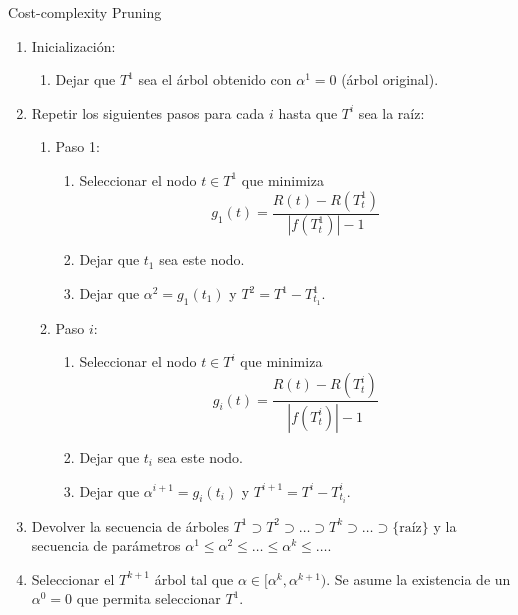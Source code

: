 \begin{algorithm}[h]
\label{ccp}
\SetAlgoLined
\caption{Cost-complexity Pruning}
\medskip
\begin{enumerate}
    \item Inicialización:
    \begin{enumerate}
        \item Dejar que $T^1$ sea el árbol obtenido con $\alpha^1 = 0$ (árbol original).
    \end{enumerate}
    \item Repetir los siguientes pasos para cada $i$ hasta que $T^i$ sea la raíz:
    \begin{enumerate}
        \item Paso 1:
        \begin{enumerate}
            \item Seleccionar el nodo $t \in T^1$ que minimiza 
            \[
            g_1(t) = \frac{R(t) - R(T_t^1)}{|f(T_t^1)| - 1}
            \]
            \item Dejar que $t_1$ sea este nodo.
            \item Dejar que $\alpha^2 = g_1(t_1)$ y $T^2 = T^1 - T_{t_1}^1$.
        \end{enumerate}
        \item Paso $i$:
        \begin{enumerate}
            \item Seleccionar el nodo $t \in T^i$ que minimiza 
            \[
            g_i(t) = \frac{R(t) - R(T_t^i)}{|f(T_t^i)| - 1}
            \]
            \item Dejar que $t_i$ sea este nodo.
            \item Dejar que $\alpha^{i+1} = g_i(t_i)$ y $T^{i+1} = T^i - T_{t_i}^i$.
        \end{enumerate}
    \end{enumerate}
    \item Devolver la secuencia de árboles $T^1 \supset T^2 \supset \ldots \supset T^k \supset \ldots \supset \{\text{raíz}\}$ y la secuencia de parámetros $\alpha^1 \leq \alpha^2 \leq \ldots \leq \alpha^k \leq \ldots$.
    \item Seleccionar el $T^{k+1}$ árbol tal que $\alpha \in [\alpha^k, \alpha^{k+1})$. Se asume la existencia de un $\alpha^0 = 0$ que permita seleccionar $T^1$.
\end{enumerate}
\end{algorithm}